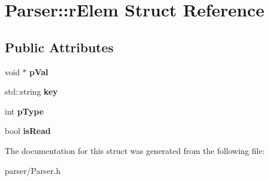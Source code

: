 \hypertarget{structParser_1_1rElem}{}\section{Parser\+:\+:r\+Elem Struct Reference}
\label{structParser_1_1rElem}
\subsection*{Public Attributes}
\begin{DoxyCompactItemize}
\item 
void $\ast$ {\bfseries p\+Val}\hypertarget{structParser_1_1rElem_a04eedd3b0b214800c9999534504213dc}{}\label{structParser_1_1rElem_a04eedd3b0b214800c9999534504213dc}

\item 
std\+::string {\bfseries key}\hypertarget{structParser_1_1rElem_a76297a803e22dbb997fdd2f81c0758d7}{}\label{structParser_1_1rElem_a76297a803e22dbb997fdd2f81c0758d7}

\item 
int {\bfseries p\+Type}\hypertarget{structParser_1_1rElem_a01f2e80f8c1df815cee03529e83d9349}{}\label{structParser_1_1rElem_a01f2e80f8c1df815cee03529e83d9349}

\item 
bool {\bfseries is\+Read}\hypertarget{structParser_1_1rElem_aacc3b86236ce9d80aef545c590600bd7}{}\label{structParser_1_1rElem_aacc3b86236ce9d80aef545c590600bd7}

\end{DoxyCompactItemize}


The documentation for this struct was generated from the following file\+:\begin{DoxyCompactItemize}
\item 
parser/Parser.\+h\end{DoxyCompactItemize}
